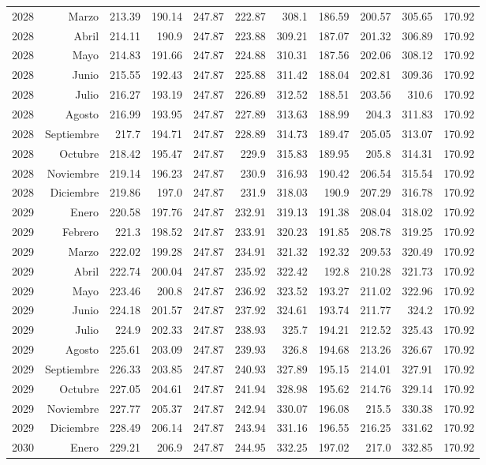 \documentclass{article}%
\begin{document}
\begin{longtable}{|l r|r|r|r|r|r|r|r|r|r|}
2028&Marzo&213.39&190.14&247.87&222.87&308.1&186.59&200.57&305.65&170.92\\%
2028&Abril&214.11&190.9&247.87&223.88&309.21&187.07&201.32&306.89&170.92\\%
2028&Mayo&214.83&191.66&247.87&224.88&310.31&187.56&202.06&308.12&170.92\\%
2028&Junio&215.55&192.43&247.87&225.88&311.42&188.04&202.81&309.36&170.92\\%
2028&Julio&216.27&193.19&247.87&226.89&312.52&188.51&203.56&310.6&170.92\\%
2028&Agosto&216.99&193.95&247.87&227.89&313.63&188.99&204.3&311.83&170.92\\%
2028&Septiembre&217.7&194.71&247.87&228.89&314.73&189.47&205.05&313.07&170.92\\%
2028&Octubre&218.42&195.47&247.87&229.9&315.83&189.95&205.8&314.31&170.92\\%
2028&Noviembre&219.14&196.23&247.87&230.9&316.93&190.42&206.54&315.54&170.92\\%
2028&Diciembre&219.86&197.0&247.87&231.9&318.03&190.9&207.29&316.78&170.92\\%
2029&Enero&220.58&197.76&247.87&232.91&319.13&191.38&208.04&318.02&170.92\\%
2029&Febrero&221.3&198.52&247.87&233.91&320.23&191.85&208.78&319.25&170.92\\%
2029&Marzo&222.02&199.28&247.87&234.91&321.32&192.32&209.53&320.49&170.92\\%
2029&Abril&222.74&200.04&247.87&235.92&322.42&192.8&210.28&321.73&170.92\\%
2029&Mayo&223.46&200.8&247.87&236.92&323.52&193.27&211.02&322.96&170.92\\%
2029&Junio&224.18&201.57&247.87&237.92&324.61&193.74&211.77&324.2&170.92\\%
2029&Julio&224.9&202.33&247.87&238.93&325.7&194.21&212.52&325.43&170.92\\%
2029&Agosto&225.61&203.09&247.87&239.93&326.8&194.68&213.26&326.67&170.92\\%
2029&Septiembre&226.33&203.85&247.87&240.93&327.89&195.15&214.01&327.91&170.92\\%
2029&Octubre&227.05&204.61&247.87&241.94&328.98&195.62&214.76&329.14&170.92\\%
2029&Noviembre&227.77&205.37&247.87&242.94&330.07&196.08&215.5&330.38&170.92\\%
2029&Diciembre&228.49&206.14&247.87&243.94&331.16&196.55&216.25&331.62&170.92\\%
2030&Enero&229.21&206.9&247.87&244.95&332.25&197.02&217.0&332.85&170.92\\%

\end{longtable}
\end{document}
